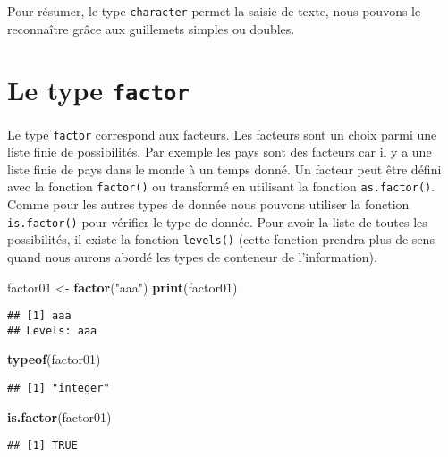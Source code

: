 \documentclass[]{book}
\newenvironment{Shaded}{\begin{snugshade}}{\end{snugshade}}
\newcommand{\KeywordTok}[1]{\textcolor[rgb]{0.13,0.29,0.53}{\textbf{#1}}}
\newcommand{\StringTok}[1]{\textcolor[rgb]{0.31,0.60,0.02}{#1}}
\newcommand{\NormalTok}[1]{#1}
\theoremstyle{definition}
\theoremstyle{definition}
\theoremstyle{definition}
\theoremstyle{remark}
\begin{document}
Pour résumer, le type \texttt{character} permet la saisie de texte, nous
pouvons le reconnaître grâce aux guillemets simples ou doubles.

\section{\texorpdfstring{Le type
\texttt{factor}}{Le type factor}}\label{le-type-factor}

Le type \texttt{factor} correspond aux facteurs. Les facteurs sont un
choix parmi une liste finie de possibilités. Par exemple les pays sont
des facteurs car il y a une liste finie de pays dans le monde à un temps
donné. Un facteur peut être défini avec la fonction \texttt{factor()} ou
transformé en utilisant la fonction \texttt{as.factor()}. Comme pour les
autres types de donnée nous pouvons utiliser la fonction
\texttt{is.factor()} pour vérifier le type de donnée. Pour avoir la
liste de toutes les possibilités, il existe la fonction
\texttt{levels()} (cette fonction prendra plus de sens quand nous aurons
abordé les types de conteneur de l'information).

\begin{Shaded}
\begin{Highlighting}[]
\NormalTok{factor01 <-}\StringTok{ }\KeywordTok{factor}\NormalTok{(}\StringTok{"aaa"}\NormalTok{)}
\KeywordTok{print}\NormalTok{(factor01)}
\end{Highlighting}
\end{Shaded}

\begin{verbatim}
## [1] aaa
## Levels: aaa
\end{verbatim}

\begin{Shaded}
\begin{Highlighting}[]
\KeywordTok{typeof}\NormalTok{(factor01)}
\end{Highlighting}
\end{Shaded}

\begin{verbatim}
## [1] "integer"
\end{verbatim}

\begin{Shaded}
\begin{Highlighting}[]
\KeywordTok{is.factor}\NormalTok{(factor01)}
\end{Highlighting}
\end{Shaded}

\begin{verbatim}
## [1] TRUE
\end{verbatim}
\end{document}
